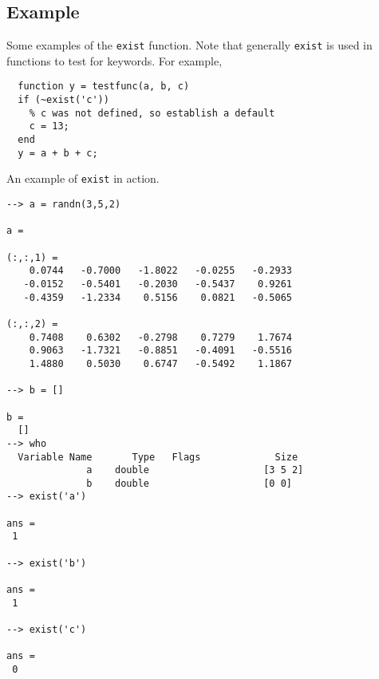 \subsection{Example}

Some examples of the \verb|exist| function.  Note that generally \verb|exist|
is used in functions to test for keywords.  For example,
\begin{verbatim}
  function y = testfunc(a, b, c)
  if (~exist('c'))
    % c was not defined, so establish a default
    c = 13;
  end
  y = a + b + c;
\end{verbatim}
An example of \verb|exist| in action.
\begin{verbatim}
--> a = randn(3,5,2)

a = 

(:,:,1) = 
    0.0744   -0.7000   -1.8022   -0.0255   -0.2933 
   -0.0152   -0.5401   -0.2030   -0.5437    0.9261 
   -0.4359   -1.2334    0.5156    0.0821   -0.5065 

(:,:,2) = 
    0.7408    0.6302   -0.2798    0.7279    1.7674 
    0.9063   -1.7321   -0.8851   -0.4091   -0.5516 
    1.4880    0.5030    0.6747   -0.5492    1.1867 

--> b = []

b = 
  []
--> who
  Variable Name       Type   Flags             Size
              a    double                    [3 5 2]
              b    double                    [0 0]
--> exist('a')

ans = 
 1 

--> exist('b')

ans = 
 1 

--> exist('c')

ans = 
 0 
\end{verbatim}
